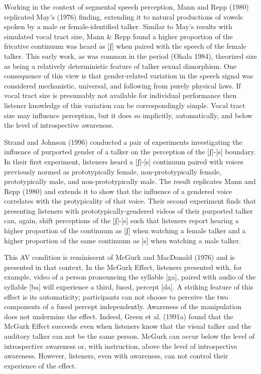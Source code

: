 \documentclass[
  letterpaper,
  DIV=11,
  numbers=noendperiod]{scrartcl}
\begin{document}
Working in the context of segmental speech perception, Mann and Repp
(1980) replicated May's (1976) finding, extending it to natural
productions of vowels spoken by a male or female-identified talker.
Similar to May's results with simulated vocal tract size, Mann \& Repp
found a higher proportion of the fricative continuum was heard as
{[}ʃ{]} when paired with the speech of the female talker. This early
work, as was common in the period (Ohala 1984), theorized size as being
a relatively deterministic feature of talker sexual dimorphism. One
consequence of this view is that gender-related variation in the speech
signal was considered mechanistic, universal, and following from purely
physical laws. If vocal tract size is presumably not available for
individual performance then listener knowledge of this variation can be
correspondingly simple. Vocal tract size may influence perception, but
it does so implicitly, automatically, and below the level of
introspective awareness.

Strand and Johnson (1996) conducted a pair of experiments investigating
the influence of purported gender of a talker on the perception of the
{[}ʃ{]}-{[}s{]} boundary. In their first experiment, listeners heard a
{[}ʃ{]}-{[}s{]} continuum paired with voices previously normed as
prototypically female, non-prototypically female, prototypically male,
and non-prototypically male. The result replicates Mann and Repp (1980)
and extends it to show that the influence of a gendered voice correlates
with the protypicality of that voice. Their second experiment finds that
presenting listeners with prototypically-gendered videos of their
purported talker can, again, shift perceptions of the {[}ʃ{]}-{[}s{]}
such that listeners report hearing a higher proportion of the continuum
as {[}ʃ{]} when watching a female talker and a higher proportion of the
same continuum as {[}s{]} when watching a male talker.

This AV condition is reminiscent of McGurk and MacDonald (1976) and is
presented in that context. In the McGurk Effect, listeners presented
with, for example, video of a person pronouncing the syllable {[}ga{]},
paired with audio of the syllable {[}ba{]} will experience a third,
fused, percept {[}da{]}. A striking feature of this effect is its
automaticity; participants can not choose to perceive the two components
of a fused percept independently. Awareness of the manipulation does not
undermine the effect. Indeed, Green et al. (1991a) found that the McGurk
Effect succeeds even when listeners know that the visual talker and the
auditory talker can not be the same person. McGurk can occur below the
level of introspective awareness or, with instruction, above the level
of introspective awareness. However, listeners, even with awareness, can
not control their experience of the effect.
\end{document}
